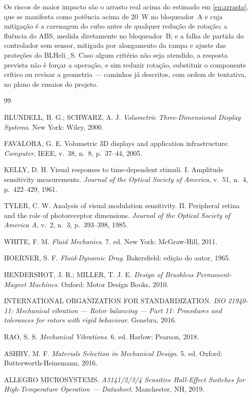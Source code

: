 \documentclass[10pt,a4paper,twocolumn]{article}
\begin{document}
Os riscos de maior impacto são o arrasto real acima do estimado em
\eqref{eq:arrasto}, que se manifesta como potência acima de 20~W no
bloqueador~A e cuja mitigação é a carenagem do cubo antes de qualquer redução
de rotação; a fluência do ABS, medida diretamente no bloqueador~B; e a falha de
partida do controlador sem sensor, mitigada por alongamento da rampa e ajuste
das proteções do BLHeli\_S. Caso algum critério não seja atendido, a resposta
prevista não é forçar a operação, e sim reduzir rotação, substituir o
componente crítico ou revisar a geometria --- caminhos já descritos, com ordem
de tentativa, no plano de ensaios do projeto.

\begin{thebibliography}{99}
\footnotesize
\setlength{\itemsep}{2.5pt}
\setlength{\parskip}{0pt}

BLUNDELL, B. G.; SCHWARZ, A. J.
\textit{Volumetric Three-Dimensional Display Systems}.
New York: Wiley, 2000.

FAVALORA, G. E.
Volumetric 3D displays and application infrastructure.
\textit{Computer}, IEEE, v.~38, n.~8, p.~37--44, 2005.

KELLY, D. H.
Visual responses to time-dependent stimuli. I. Amplitude sensitivity
measurements. \textit{Journal of the Optical Society of America}, v.~51, n.~4,
p.~422--429, 1961.

TYLER, C. W.
Analysis of visual modulation sensitivity. II. Peripheral retina and the role
of photoreceptor dimensions. \textit{Journal of the Optical Society of America
A}, v.~2, n.~3, p.~393--398, 1985.

WHITE, F. M.
\textit{Fluid Mechanics}. 7. ed. New York: McGraw-Hill, 2011.

HOERNER, S. F.
\textit{Fluid-Dynamic Drag}. Bakersfield: edição do autor, 1965.

HENDERSHOT, J. R.; MILLER, T. J. E.
\textit{Design of Brushless Permanent-Magnet Machines}.
Oxford: Motor Design Books, 2010.

INTERNATIONAL ORGANIZATION FOR STANDARDIZATION.
\textit{ISO 21940-11: Mechanical vibration --- Rotor balancing --- Part 11:
Procedures and tolerances for rotors with rigid behaviour}. Genebra, 2016.

RAO, S. S.
\textit{Mechanical Vibrations}. 6. ed. Harlow: Pearson, 2018.

ASHBY, M. F.
\textit{Materials Selection in Mechanical Design}. 5. ed. Oxford:
Butterworth-Heinemann, 2016.

ALLEGRO MICROSYSTEMS.
\textit{A3141/2/3/4 Sensitive Hall-Effect Switches for High-Temperature
Operation --- Datasheet}. Manchester, NH, 2019.

\end{thebibliography}
\end{document}
